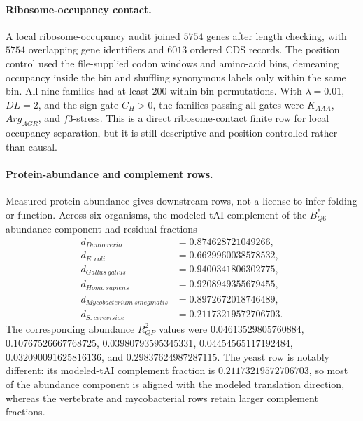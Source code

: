 \paragraph{Ribosome-occupancy contact.}
A local ribosome-occupancy audit joined $5754$ genes after length checking, with $5754$ overlapping gene identifiers and $6013$ ordered CDS records.  The position control used the file-supplied codon windows and amino-acid bins, demeaning occupancy inside the bin and shuffling synonymous labels only within the same bin.  All nine families had at least $200$ within-bin permutations.  With $\lambda=0.01$, $DL=2$, and the sign gate $C_H>0$, the families passing all gates were $K_{AAA}$, $Arg_{AGR}$, and $f3$-stress.  This is a direct ribosome-contact finite row for local occupancy separation, but it is still descriptive and position-controlled rather than causal.

\paragraph{Protein-abundance and complement rows.}
Measured protein abundance gives downstream rows, not a license to infer folding or function.  Across six organisms, the modeled-tAI complement of the $B^{\ast}_{Q6}$ abundance component had residual fractions
$$
\begin{aligned}
d_{Danio\ rerio} &= 0.874628721049266,\\
d_{E.\ coli} &= 0.6629960038578532,\\
d_{Gallus\ gallus} &= 0.9400341806302775,\\
d_{Homo\ sapiens} &= 0.9208949355679455,\\
d_{Mycobacterium\ smegmatis} &= 0.8972672018746489,\\
d_{S.\ cerevisiae} &= 0.21173219572706703.
\end{aligned}
$$
The corresponding abundance $R^2_{QP}$ values were $0.04613529805760884$, $0.10767526667768725$, $0.03980793595345331$, $0.04454565117192484$, $0.032090091625816136$, and $0.29837624987287115$.  The yeast row is notably different: its modeled-tAI complement fraction is $0.21173219572706703$, so most of the abundance component is aligned with the modeled translation direction, whereas the vertebrate and mycobacterial rows retain larger complement fractions.


